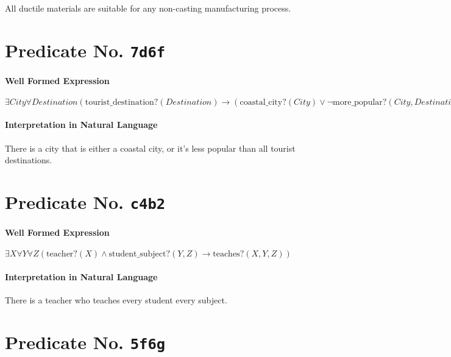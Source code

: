 \documentclass[11pt]{article}
\begin{document}
All ductile materials are suitable for any non-casting manufacturing process.



\section{Predicate No. \texttt{7d6f}}
\label{sec:orgb8d4657}

\paragraph*{Well Formed Expression}
\label{sec:org2a4d02a}

\(\exists \mathit{City} \forall \mathit{Destination} (\mathrm{tourist\_destination?}(\mathit{Destination}) \rightarrow (\mathrm{coastal\_city?}(\mathit{City}) \lor \neg \mathrm{more\_popular?}(\mathit{City}, \mathit{Destination})))\)

\paragraph*{Interpretation in Natural Language}
\label{sec:orga98d91d}

There is a city that is either a coastal city, or it's less popular than all tourist destinations.



\section{Predicate No. \texttt{c4b2}}
\label{sec:orgbd52b26}

\paragraph*{Well Formed Expression}
\label{sec:orgb2df037}

\(\exists X \forall Y \forall Z (\text{teacher?}(X) \land \text{student\_subject?}(Y, Z) \rightarrow \text{teaches?}(X, Y, Z))\)

\paragraph*{Interpretation in Natural Language}
\label{sec:orge468a7a}

There is a teacher who teaches every student every subject.



\section{Predicate No. \texttt{5f6g}}
\label{sec:org7db1216}
\end{document}
